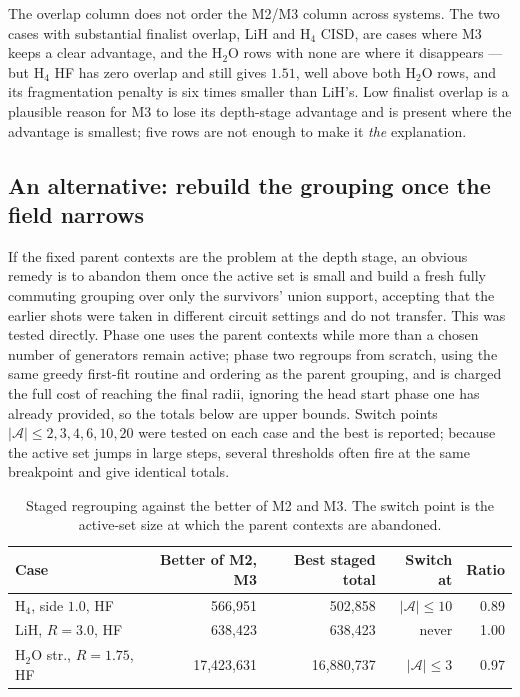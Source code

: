 \documentclass[10pt]{article}
\begin{document}
The overlap column does not order the M2/M3 column across systems. The two cases with substantial finalist overlap, LiH and H$_4$ CISD, are cases where M3 keeps a clear advantage, and the H$_2$O rows with none are where it disappears --- but H$_4$ HF has zero overlap and still gives $1.51$, well above both H$_2$O rows, and its fragmentation penalty is six times smaller than LiH's. Low finalist overlap is a plausible reason for M3 to lose its depth-stage advantage and is present where the advantage is smallest; five rows are not enough to make it \emph{the} explanation.

\subsection{An alternative: rebuild the grouping once the field narrows}
\label{sec:hybrid}

If the fixed parent contexts are the problem at the depth stage, an obvious remedy is to abandon them once the active set is small and build a fresh fully commuting grouping over only the survivors' union support, accepting that the earlier shots were taken in different circuit settings and do not transfer. This was tested directly. Phase one uses the parent contexts while more than a chosen number of generators remain active; phase two regroups from scratch, using the same greedy first-fit routine and ordering as the parent grouping, and is charged the full cost of reaching the final radii, ignoring the head start phase one has already provided, so the totals below are upper bounds. Switch points $|\mathcal A|\le2,3,4,6,10,20$ were tested on each case and the best is reported; because the active set jumps in large steps, several thresholds often fire at the same breakpoint and give identical totals.

\begin{table}[!htbp]
\centering
\scriptsize
\caption{Staged regrouping against the better of M2 and M3. The switch point is the active-set size at which the parent contexts are abandoned.}
\label{tab:hybrid}
\begin{tabular}{lrrrr}
\toprule
Case & Better of M2, M3 & Best staged total & Switch at & Ratio \\
\midrule
H$_4$, side $1.0$, HF & 566,951 & 502,858 & $|\mathcal A|\le 10$ & 0.89 \\
LiH, $R{=}3.0$, HF & 638,423 & 638,423 & never & 1.00 \\
H$_2$O str., $R{=}1.75$, HF & 17,423,631 & 16,880,737 & $|\mathcal A|\le 3$ & 0.97 \\
\bottomrule
\end{tabular}
\end{table}
\end{document}

